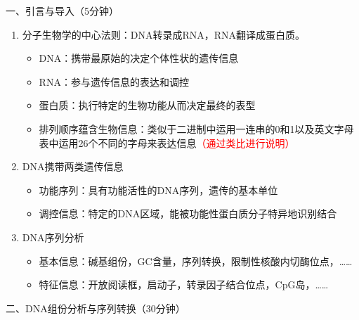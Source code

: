 \documentclass{TIJMUjiaoanLL}
\begin{document}
\firstTail


\newpage
\otherHeader

\noindent
一、引言与导入（5分钟）
\begin{enumerate}
  \item 分子生物学的中心法则：DNA转录成RNA，RNA翻译成蛋白质。
    \begin{itemize}
      \item DNA：携带最原始的决定个体性状的遗传信息
      \item RNA：参与遗传信息的表达和调控
      \item 蛋白质：执行特定的生物功能从而决定最终的表型
      \item 排列顺序蕴含生物信息：类似于二进制中运用一连串的0和1以及英文字母表中运用26个不同的字母来表达信息\textcolor{red}{（通过类比进行说明）}
    \end{itemize}
  \item DNA携带两类遗传信息
    \begin{itemize}
      \item 功能序列：具有功能活性的DNA序列，遗传的基本单位
      \item 调控信息：特定的DNA区域，能被功能性蛋白质分子特异地识别结合
    \end{itemize}
  \item DNA序列分析
    \begin{itemize}
      \item 基本信息：碱基组份，GC含量，序列转换，限制性核酸内切酶位点，……
      \item 特征信息：开放阅读框，启动子，转录因子结合位点，CpG岛，……
    \end{itemize}
\end{enumerate}

\vspace*{0.2cm}
\noindent
二、DNA组份分析与序列转换（30分钟）
\end{document}
